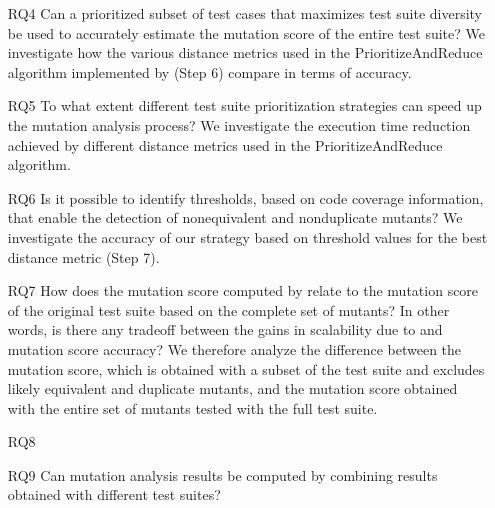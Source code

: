 \begin{itemize}
    
    \item[RQ4]  Can a prioritized subset of test cases that maximizes test suite diversity be used to accurately estimate the mutation score of the entire test suite?
    We investigate how the various distance metrics used in the PrioritizeAndReduce algorithm implemented by \APPR  (Step 6) compare in terms of accuracy. 
    

    \item[RQ5]  To what extent different test suite prioritization strategies can speed up the mutation analysis process? We investigate the execution time reduction achieved by different distance metrics used in the PrioritizeAndReduce algorithm. 
    

    \item[RQ6]  Is it possible to identify thresholds, based on code coverage information, that enable the detection of nonequivalent and nonduplicate mutants? We investigate 
    the accuracy of our strategy 
    based on threshold values for the best distance metric  (\APPR  Step 7).
    

    \item[RQ7]  How does the mutation score computed by \APPR relate to the mutation score of the original test suite based on the complete set of mutants? In other words, is there any tradeoff between the gains in scalability due to \APPR and  mutation score accuracy? We therefore analyze the difference between the \APPR mutation score, which is obtained with a subset of the test suite and excludes likely equivalent and duplicate mutants, and the mutation score obtained with the entire set of mutants tested with the full test suite.
    
    \item[RQ8] 
    
    \item[RQ9] Can mutation analysis results be computed by combining results obtained with different test suites?


    
\end{itemize}

